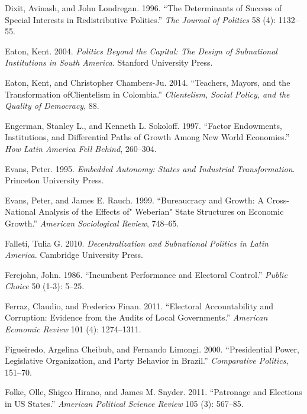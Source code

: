 \documentclass[12pt,]{article}
\begin{document}
\leavevmode\hypertarget{ref-dixit_determinants_1996}{}%
Dixit, Avinash, and John Londregan. 1996. ``The Determinants of Success
of Special Interests in Redistributive Politics.'' \emph{The Journal of
Politics} 58 (4): 1132--55.

\leavevmode\hypertarget{ref-eaton_politics_2004}{}%
Eaton, Kent. 2004. \emph{Politics Beyond the Capital: The Design of
Subnational Institutions in South America}. Stanford University Press.

\leavevmode\hypertarget{ref-eaton_teachers_2014}{}%
Eaton, Kent, and Christopher Chambers-Ju. 2014. ``Teachers, Mayors, and
the Transformation ofClientelism in Colombia.'' \emph{Clientelism,
Social Policy, and the Quality of Democracy}, 88.

\leavevmode\hypertarget{ref-engerman_factor_1997}{}%
Engerman, Stanley L., and Kenneth L. Sokoloff. 1997. ``Factor
Endowments, Institutions, and Differential Paths of Growth Among New
World Economies.'' \emph{How Latin America Fell Behind}, 260--304.

\leavevmode\hypertarget{ref-evans_embedded_1995}{}%
Evans, Peter. 1995. \emph{Embedded Autonomy: States and Industrial
Transformation}. Princeton University Press.

\leavevmode\hypertarget{ref-evans_bureaucracy_1999}{}%
Evans, Peter, and James E. Rauch. 1999. ``Bureaucracy and Growth: A
Cross-National Analysis of the Effects of" Weberian" State Structures on
Economic Growth.'' \emph{American Sociological Review}, 748--65.

\leavevmode\hypertarget{ref-falleti_decentralization_2010}{}%
Falleti, Tulia G. 2010. \emph{Decentralization and Subnational Politics
in Latin America}. Cambridge University Press.

\leavevmode\hypertarget{ref-ferejohn_incumbent_1986}{}%
Ferejohn, John. 1986. ``Incumbent Performance and Electoral Control.''
\emph{Public Choice} 50 (1-3): 5--25.

\leavevmode\hypertarget{ref-ferraz_electoral_2011}{}%
Ferraz, Claudio, and Frederico Finan. 2011. ``Electoral Accountability
and Corruption: Evidence from the Audits of Local Governments.''
\emph{American Economic Review} 101 (4): 1274--1311.

\leavevmode\hypertarget{ref-figueiredo_presidential_2000}{}%
Figueiredo, Argelina Cheibub, and Fernando Limongi. 2000. ``Presidential
Power, Legislative Organization, and Party Behavior in Brazil.''
\emph{Comparative Politics}, 151--70.

\leavevmode\hypertarget{ref-folke_patronage_2011}{}%
Folke, Olle, Shigeo Hirano, and James M. Snyder. 2011. ``Patronage and
Elections in US States.'' \emph{American Political Science Review} 105
(3): 567--85.
\end{document}
